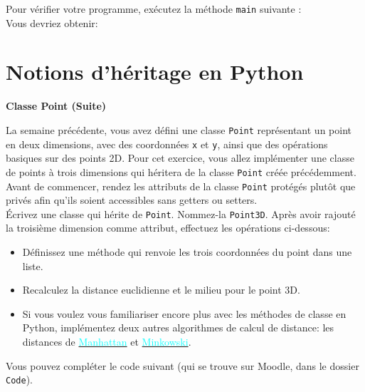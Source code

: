 Pour vérifier votre programme, exécutez la méthode \lstinline{main} suivante : \\

 

Vous devriez obtenir:
 



\section{Notions d'héritage en Python}
\begin{Exercice}[15 minutes]\textbf{Classe Point (Suite)}

    La semaine précédente, vous avez défini une classe \lstinline{Point} représentant un point en deux dimensions, avec des coordonnées \lstinline{x} et \lstinline{y}, ainsi que des opérations basiques sur des points 2D. Pour cet exercice, vous allez implémenter une classe de points à trois dimensions qui héritera de la classe \lstinline{Point} créée précédemment. \\
    
	Avant de commencer, rendez les attributs de la classe \lstinline{Point} protégés plutôt que privés afin qu'ils soient accessibles sans getters ou setters. \\
    
    Écrivez une classe qui hérite de \lstinline{Point}. Nommez-la \lstinline{Point3D}. Après avoir rajouté la troisième dimension comme attribut, effectuez les opérations ci-dessous:
    
    \begin{itemize}
        \item Définissez une méthode qui renvoie les trois coordonnées du point dans une liste.
        \item Recalculez la distance euclidienne et le milieu pour le point 3D.
        \item \advanced Si vous voulez vous familiariser encore plus avec les méthodes de classe en Python, implémentez deux autres algorithmes de calcul de distance: les distances de \href{https://fr.wikipedia.org/wiki/Distance_de_Manhattan}{\textcolor{cyan}{Manhattan}} et \href{https://en.wikipedia.org/wiki/Minkowski_distance}{\textcolor{cyan}{Minkowski}}.
    \end{itemize}

    Vous pouvez compléter le code suivant (qui se trouve sur Moodle, dans le dossier \lstinline{Code}).
     
    

\end{Exercice}
